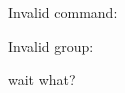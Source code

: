 \documentclass{article}
\begin{document}
Invalid command: \asdf

Invalid group:
\begin{qwerty}
    wait what?
\end{qwerty}
\end{document}
